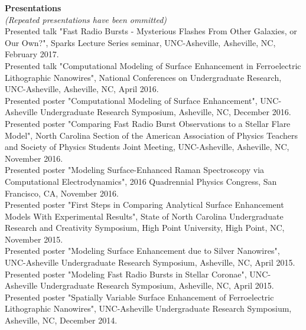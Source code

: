 \documentclass[a4paper, 11pt]{article}
\newcommand{\noi}{\noindent}
\begin{document}
\noi \textbf{Presentations}
\\
\emph{(Repeated presentations have been ommitted)}
\\

\noi Presented talk "Fast Radio Bursts - Mysterious Flashes From Other Galaxies, or Our Own?", Sparks Lecture Series seminar, UNC-Asheville, Asheville, NC, February 2017.
\\

\noi Presented talk "Computational Modeling of Surface Enhancement in Ferroelectric Lithographic Nanowires", National Conferences on Undergraduate Research, UNC-Asheville, Asheville, NC, April 2016.
\\

\noi Presented poster "Computational Modeling of Surface Enhancement", UNC-Asheville Undergraduate Research Symposium, Asheville, NC, December 2016.
\\

\noi Presented poster "Comparing Fast Radio Burst Observations to a Stellar Flare Model", North Carolina Section of the American Association of Physics Teachers and Society of Physics Students Joint Meeting, UNC-Asheville, Asheville, NC, November 2016.
\\

\noi Presented poster "Modeling Surface-Enhanced Raman Spectroscopy via Computational Electrodynamics", 2016 Quadrennial Physics Congress, San Francisco, CA, November 2016.
\\

\noi Presented poster "First Steps in Comparing Analytical Surface Enhancement Models With Experimental Results", State of North Carolina Undergraduate Research and Creativity Symposium, High Point University, High Point, NC, November 2015.
\\

\noi Presented poster "Modeling Surface Enhancement due to Silver Nanowires", UNC-Asheville Undergraduate Research Symposium, Asheville, NC, April 2015.
\\

\noi Presented poster "Modeling Fast Radio Bursts in Stellar Coronae", UNC-Asheville Undergraduate Research Symposium, Asheville, NC, April 2015.
\\

\noi Presented poster "Spatially Variable Surface Enhancement of
Ferroelectric Lithographic Nanowires", UNC-Asheville Undergraduate Research Symposium, Asheville, NC, December 2014.
\\
\end{document}
